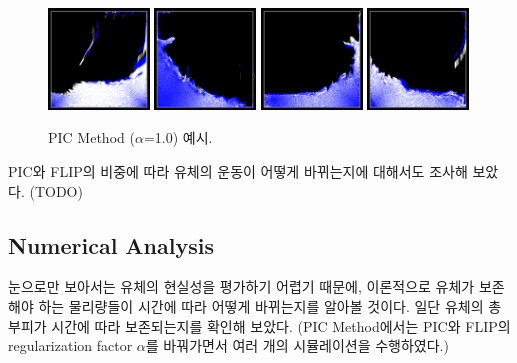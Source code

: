 \documentclass[11pt, A4]{article}
\begin{document}
\begin{figure}[h]
\includegraphics[width=0.24\textwidth]{realism-pic-1}
\includegraphics[width=0.24\textwidth]{realism-pic-2}
\includegraphics[width=0.24\textwidth]{realism-pic-3}
\includegraphics[width=0.24\textwidth]{realism-pic-4}
  \caption{PIC Method ($\alpha$=1.0) 예시.}
  \label{realism-pic}
\end{figure}

PIC와 FLIP의 비중에 따라 유체의 운동이 어떻게 바뀌는지에 대해서도 조사해 보았다. (TODO)

\subsection{Numerical Analysis}

눈으로만 보아서는 유체의 현실성을 평가하기 어렵기 때문에, 이론적으로 유체가 보존해야 하는 물리량들이 시간에 따라 어떻게 바뀌는지를 알아볼 것이다. 일단 유체의 총 부피가 시간에 따라 보존되는지를 확인해 보았다. (PIC Method에서는 PIC와 FLIP의 regularization factor $\alpha$를 바꿔가면서 여러 개의 시뮬레이션을 수행하였다.)
\end{document}

